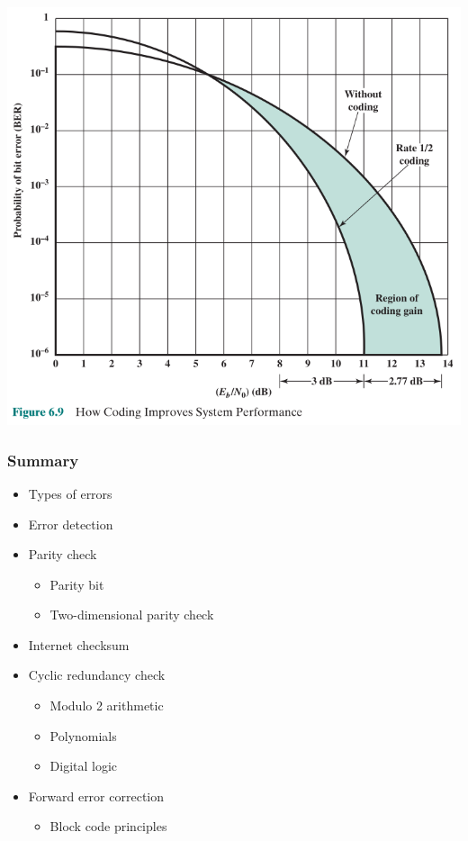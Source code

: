 \documentclass[pdflatex,compress]{beamer}
\begin{document}
\begin{frame}
	\begin{center}
		\includegraphics[width=0.7\linewidth]{img/img09}
	\end{center}
\end{frame}

\begin{frame}
	\frametitle{Summary}
	\begin{multicols}{2}
	\begin{itemize}
		\item Types of errors
		\item Error detection
		\item Parity check
		\begin{itemize}
			\item Parity bit
			\item Two-dimensional parity check
		\end{itemize}
		\item Internet checksum
		\item Cyclic redundancy check
		\begin{itemize}
			\item Modulo 2 arithmetic
			\item Polynomials
			\item Digital logic
		\end{itemize}
		\item Forward error correction
		\begin{itemize}
			\item Block code principles
		\end{itemize}
	\end{itemize}
	\end{multicols}
\end{frame}
\end{document}
